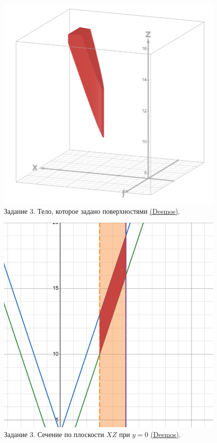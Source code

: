 \begin{figure}[h!t]
    \centering
    \includegraphics[width=0.6\linewidth]{Task3/Figure_volume_shape.png}
    \caption{Задание 3. Тело, которое задано поверхностями \underline{\href{https://www.desmos.com/3D/kl5guofsih}{(Desmos)}}. }
\end{figure}

\begin{figure}[h!t]
    \centering
    \includegraphics[width=0.6\linewidth]{Task3/Figure_XZ_intersection.png}
    \caption{Задание 3. Сечение по плоскости $XZ$ при $y=0$ \underline{\href{https://www.desmos.com/Calculator/q5wb8deh0a}{(Desmos)}}. }
\end{figure}
